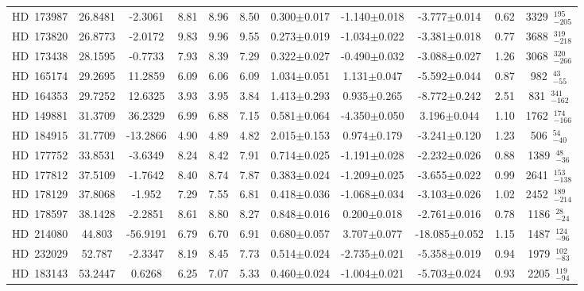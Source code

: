 {\begin{longtable}{lcccccccccc}
HD~173987 & 26.8481 & -2.3061 & 8.81 & 8.96 & 8.50 & 0.300$\pm$0.017 & -1.140$\pm$0.018 & -3.777$\pm$0.014 & 0.62 & 3329~$_{-205}^{195}$ \\
\noalign{\smallskip}
HD~173820 & 26.8773 & -2.0172 & 9.83 & 9.96 & 9.55 & 0.273$\pm$0.019 & -1.034$\pm$0.022 & -3.381$\pm$0.018 & 0.77 & 3688~$_{-218}^{319}$ \\
\noalign{\smallskip}
HD~173438 & 28.1595 & -0.7733 & 7.93 & 8.39 & 7.29 & 0.322$\pm$0.027 & -0.490$\pm$0.032 & -3.088$\pm$0.027 & 1.26 & 3068~$_{-266}^{320}$ \\
\noalign{\smallskip}
HD~165174 & 29.2695 & 11.2859 & 6.09 & 6.06 & 6.09 & 1.034$\pm$0.051 & 1.131$\pm$0.047 & -5.592$\pm$0.044 & 0.87 & 982~$_{-55}^{43}$ \\
\noalign{\smallskip}
HD~164353 & 29.7252 & 12.6325 & 3.93 & 3.95 & 3.84 & 1.413$\pm$0.293 & 0.935$\pm$0.265 & -8.772$\pm$0.242 & 2.51 & 831~$_{-162}^{341}$ \\
\noalign{\smallskip}
HD~149881 & 31.3709 & 36.2329 & 6.99 & 6.88 & 7.15 & 0.581$\pm$0.064 & -4.350$\pm$0.050 & 3.196$\pm$0.044 & 1.10 & 1762~$_{-166}^{174}$ \\
\noalign{\smallskip}
HD~184915 & 31.7709 & -13.2866 & 4.90 & 4.89 & 4.82 & 2.015$\pm$0.153 & 0.974$\pm$0.179 & -3.241$\pm$0.120 & 1.23 & 506~$_{-40}^{54}$ \\
\noalign{\smallskip}
HD~177752 & 33.8531 & -3.6349 & 8.24 & 8.42 & 7.91 & 0.714$\pm$0.025 & -1.191$\pm$0.028 & -2.232$\pm$0.026 & 0.88 & 1389~$_{-36}^{48}$ \\
\noalign{\smallskip}
HD~177812 & 37.5109 & -1.7642 & 8.40 & 8.74 & 7.87 & 0.383$\pm$0.024 & -1.209$\pm$0.025 & -3.655$\pm$0.022 & 0.99 & 2641~$_{-138}^{153}$ \\
\noalign{\smallskip}
HD~178129 & 37.8068 & -1.952 & 7.29 & 7.55 & 6.81 & 0.418$\pm$0.036 & -1.068$\pm$0.034 & -3.103$\pm$0.026 & 1.02 & 2452~$_{-214}^{189}$ \\
\noalign{\smallskip}
HD~178597 & 38.1428 & -2.2851 & 8.61 & 8.80 & 8.27 & 0.848$\pm$0.016 & 0.200$\pm$0.018 & -2.761$\pm$0.016 & 0.78 & 1186~$_{-24}^{28}$ \\
\noalign{\smallskip}
HD~214080 & 44.803 & -56.9191 & 6.79 & 6.70 & 6.91 & 0.680$\pm$0.057 & 3.707$\pm$0.077 & -18.085$\pm$0.052 & 1.15 & 1487~$_{-96}^{124}$ \\
\noalign{\smallskip}
HD~232029 & 52.787 & -2.3347 & 8.19 & 8.45 & 7.73 & 0.514$\pm$0.024 & -2.735$\pm$0.021 & -5.358$\pm$0.019 & 0.94 & 1979~$_{-83}^{102}$ \\
\noalign{\smallskip}
HD~183143 & 53.2447 & 0.6268 & 6.25 & 7.07 & 5.33 & 0.460$\pm$0.024 & -1.004$\pm$0.021 & -5.703$\pm$0.024 & 0.93 & 2205~$_{-94}^{119}$ \\

\end{longtable}}
